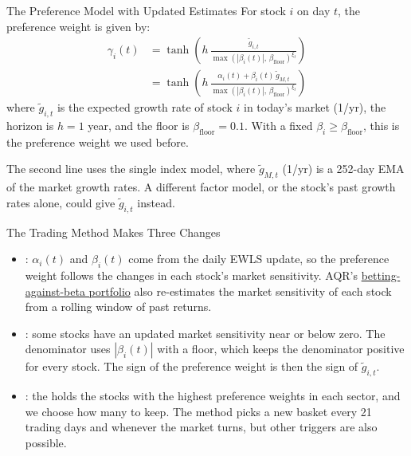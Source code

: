 \begin{frame}{The Preference Model with Updated Estimates}
  For stock $i$ on day $t$, the preference weight is given by:
  \begin{equation*}
    \boxed{\begin{aligned}
      \gamma_{i}(t)&=\tanh\left(h\,\frac{\tilde{g}_{i,t}}{\max\left(|\beta_{i}(t)|,\,\beta_{\text{floor}}\right)^{\xi_{t}}}\right)\\
      &=\tanh\left(h\,\frac{\alpha_{i}(t)+\beta_{i}(t)\,\tilde{g}_{M,t}}{\max\left(|\beta_{i}(t)|,\,\beta_{\text{floor}}\right)^{\xi_{t}}}\right)
    \end{aligned}}
  \end{equation*}
  where $\tilde{g}_{i,t}$ is the expected growth rate of stock $i$ in today's market (1/yr), the
  horizon is $h=1$ year, and the floor is $\beta_{\text{floor}}=0.1$. With a fixed
  $\beta_{i}\geq\beta_{\text{floor}}$, this is the preference weight we used before.

  \vspace{0.4em}
  The second line uses the single index model, where $\tilde{g}_{M,t}$ (1/yr) is a 252-day EMA of
  the market growth rates. A different factor model, or the stock's past growth rates alone,
  could give $\tilde{g}_{i,t}$ instead.
\end{frame}

\begin{frame}{The Trading Method Makes Three Changes}
  \begin{itemize}\setlength{\itemsep}{0.6em}
    \item {}: $\alpha_{i}(t)$ and $\beta_{i}(t)$ come from the daily EWLS
      update, so the preference weight follows the changes in each stock's market sensitivity.
      AQR's \href{https://www.aqr.com/Insights/Research/Journal-Article/Betting-Against-Beta}{betting-against-beta portfolio}
      also re-estimates the market sensitivity of each stock from a rolling window of past returns.
    \item {}: some stocks have an updated market
      sensitivity near or below zero. The denominator uses $|\beta_{i}(t)|$ with a floor, which
      keeps the denominator positive for every stock. The sign of the preference weight is then
      the sign of $\tilde{g}_{i,t}$.
    \item {}: the  holds the stocks with the
      highest preference weights in each sector, and we choose how many to keep. The method picks
      a new basket every 21 trading days and whenever the market turns, but other triggers are
      also possible.
  \end{itemize}
\end{frame}

